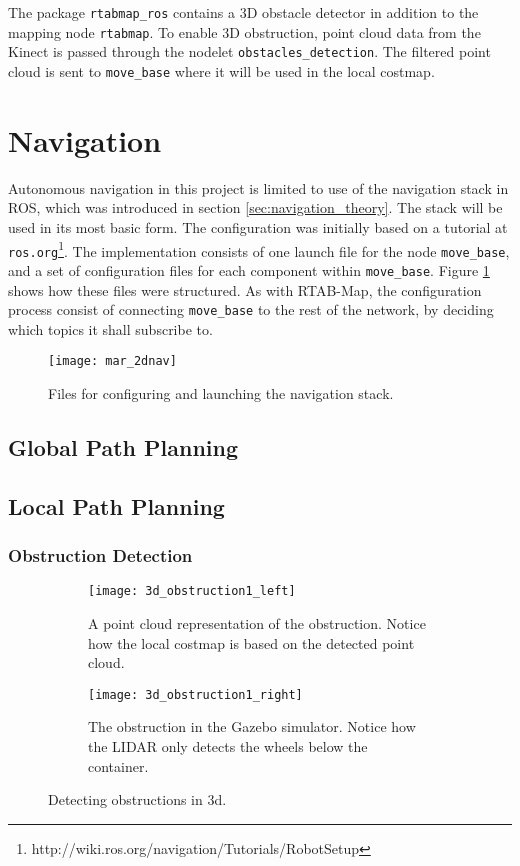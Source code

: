 The package \texttt{rtabmap\_ros} contains a 3D obstacle detector in addition to the mapping node \texttt{rtabmap}. To enable 3D obstruction, point cloud data from the Kinect is passed through the nodelet \texttt{obstacles\_detection}. The filtered point cloud is sent to \texttt{move\_base} where it will be used in the local costmap.

\section{Navigation}

Autonomous navigation in this project is limited to use of the navigation stack in \ac{ROS}, which was introduced in section \ref{sec:navigation_theory}. The stack will be used in its most basic form. The configuration was initially based on a tutorial at \texttt{ros.org}\footnote{http://wiki.ros.org/navigation/Tutorials/RobotSetup}. The implementation consists of one launch file for the node \texttt{move\_base}, and a set of configuration files for each component within \texttt{move\_base}. Figure \ref{fig:mar_2dnav} shows how these files were structured. As with \ac{RTAB-Map}, the configuration process consist of connecting \texttt{move\_base} to the rest of the network, by deciding which topics it shall subscribe to. 

\begin{figure}[h]
	\centering
	\texttt{[image: mar\_2dnav]}
	\caption{Files for configuring and launching the navigation stack.}
	\label{fig:mar_2dnav}
\end{figure}

\subsection{Global Path Planning}

\subsection{Local Path Planning}

\subsubsection{Obstruction Detection}


\begin{figure}
	\centering
	\begin{subfigure}[b]{0.53\textwidth}
		\texttt{[image: 3d\_obstruction1\_left]}
		\caption{A point cloud representation of the obstruction. Notice how the local costmap is based on the detected point cloud.}
		\label{fig:device_select}
	\end{subfigure}
		\begin{subfigure}[b]{0.45\textwidth}
			\texttt{[image: 3d\_obstruction1\_right]}
			\caption{The obstruction in the Gazebo simulator. Notice how the LIDAR only detects the wheels below the container.}
			\label{fig:bt_request}
		\end{subfigure}
	\caption{\label{fig:3d_obstruction1}Detecting obstructions in 3d.}
\end{figure}

